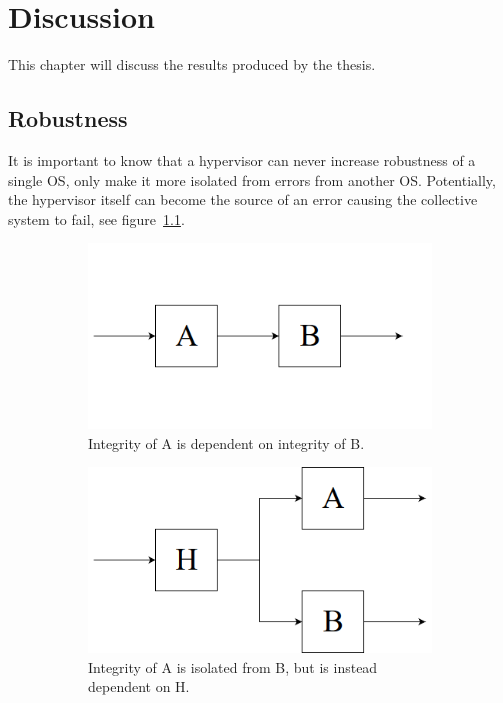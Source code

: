 \chapter{Discussion}
This chapter will discuss the results produced by the thesis.

\section{Robustness}
It is important to know that a hypervisor can never increase robustness of a single OS, only make it more isolated from errors from another OS. Potentially, the hypervisor itself can become the source of an error causing the collective system to fail, see figure~\ref{fig:monitor}.

\begin{figure}[H]
\centering
\begin{subfigure}[b]{0.45\textwidth}
\includegraphics[width=\textwidth]{./img/discussion_nomonitor.png}
\caption{Integrity of A is dependent on integrity of B.}
\end{subfigure}
\begin{subfigure}[b]{0.45\textwidth}
\includegraphics[width=\textwidth]{./img/discussion_monitor.png}
\caption{Integrity of A is isolated from B, but is instead dependent on H.}
\end{subfigure}
\caption{}
\label{fig:monitor}
\end{figure}

